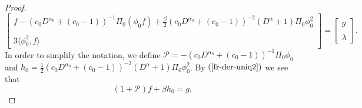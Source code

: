 \documentclass[12pt,reqno]{amsart}
\newcommand{\2}{L^2_{per}(0, T)}
\numberwithin{equation}{section}
\numberwithin{figure}{section}
\begin{document}
\begin{proof}
	\begin{equation}\label{fr-der-uniq2}
\left[\begin{array}{ccccc} \displaystyle f-(c_0D^{\alpha_0}+(c_0-1))^{-1}\Pi_0(\phi_0 f) + \frac{\beta}{2} (c_0D^{\alpha_0}+(c_0-1))^{-2}(D^{\alpha}+1)\Pi_0\phi_0^2\\\\
\displaystyle	3\langle\phi_0^2,f\rangle \end{array}\right]=\left[\begin{array}{llll}g\\\\
	\lambda\end{array}\right].
	\end{equation}
	In order to simplify the notation, we define $\mathcal{P}=-(c_0D^{\alpha_0}+(c_0-1))^{-1}\Pi_0\phi_0$ and $h_0=\frac{1}{2}(c_0D^{\alpha_0}+(c_0-1))^{-2}(D^{\alpha}+1)\Pi_0\phi_0^2$. By $(\ref{fr-der-uniq2})$ we see that
	\begin{equation}\label{fr-der-uniq3}
	(1+\mathcal{P})f+\beta h_0=g,
	\end{equation}
	

\end{proof}
\end{document}
